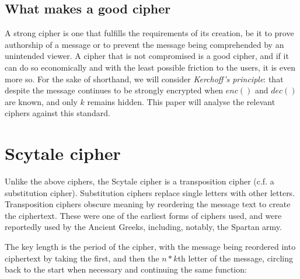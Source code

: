 \documentclass{AIAA}
\begin{document}
\subsection{What makes a good cipher}

A strong cipher is one that fulfills the requirements of its creation, be it to prove authorship of a message or to prevent the message being comprehended by an unintended viewer. A cipher that is not compromised is a good cipher, and if it can do so economically and with the least possible friction to the users, it is even more so. For the sake of shorthand, we will consider \textit{Kerchoff's principle}: that despite the message continues to be strongly encrypted when $enc()$ and $dec()$ are known, and only $k$ remains hidden. This paper will analyse the relevant ciphers against this standard.

\section{Scytale cipher}
Unlike the above ciphers, the Scytale cipher is a transposition cipher (c.f. a substitution cipher). Substitution ciphers replace single letters with other letters. Transposition ciphers obscure meaning by reordering the message text to create the ciphertext. These were one of the earliest forms of ciphers used, and were reportedly used by the Ancient Greeks, including, notably, the Spartan army.

The key length is the period of the cipher, with the message being reordered into ciphertext by taking the first, and then the $n * k$th letter of the message, circling back to the start when necessary and continuing the same function:
\end{document}
